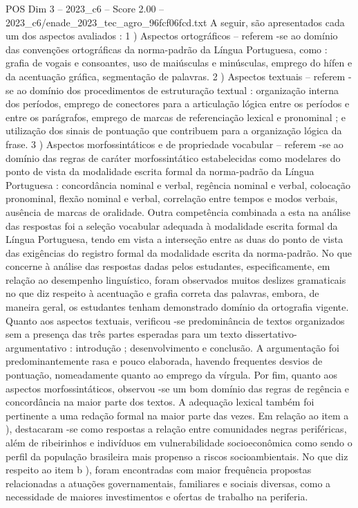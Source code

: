 \begin{textsample}{POS Dim 3 – 2023\_c6 – Score 2.00 – 2023\_c6/enade\_2023\_tec\_agro\_96fcf06fcd.txt}
A seguir, são apresentados cada um dos aspectos avaliados : 1 ) Aspectos ortográficos – referem -se ao domínio das convenções ortográficas da norma-padrão da Língua Portuguesa, como : grafia de vogais e consoantes, uso de maiúsculas e minúsculas, emprego do hífen e da acentuação gráfica, segmentação de palavras. 2 ) Aspectos textuais – referem -se ao domínio dos procedimentos de estruturação textual : organização interna dos períodos, emprego de conectores para a articulação lógica entre os períodos e entre os parágrafos, emprego de marcas de referenciação lexical e pronominal ; e utilização dos sinais de pontuação que contribuem para a organização lógica da frase. 3 ) Aspectos morfossintáticos e de propriedade vocabular – referem -se ao domínio das regras de caráter morfossintático estabelecidas como modelares do ponto de vista da modalidade escrita formal da norma-padrão da Língua Portuguesa : concordância nominal e verbal, regência nominal e verbal, colocação pronominal, flexão nominal e verbal, correlação entre tempos e modos verbais, ausência de marcas de oralidade.
Outra competência combinada a esta na análise das respostas foi a seleção vocabular adequada à modalidade escrita formal da Língua Portuguesa, tendo em vista a interseção entre as duas do ponto de vista das exigências do registro formal da modalidade escrita da norma-padrão.
No que concerne à análise das respostas dadas pelos estudantes, especificamente, em relação ao desempenho linguístico, foram observados muitos deslizes gramaticais no que diz respeito à acentuação e grafia correta das palavras, embora, de maneira geral, os estudantes tenham demonstrado domínio da ortografia vigente.
Quanto aos aspectos textuais, verificou -se predominância de textos organizados sem a presença das três partes esperadas para um texto dissertativo-argumentativo : introdução ; desenvolvimento e conclusão.
A argumentação foi predominantemente rasa e pouco elaborada, havendo frequentes desvios de pontuação, nomeadamente quanto ao emprego da vírgula.
Por fim, quanto aos aspectos morfossintáticos, observou -se um bom domínio das regras de regência e concordância na maior parte dos textos.
A adequação lexical também foi pertinente a uma redação formal na maior parte das vezes.
Em relação ao item a ), destacaram -se como respostas a relação entre comunidades negras periféricas, além de ribeirinhos e indivíduos em vulnerabilidade socioeconômica como sendo o perfil da população brasileira mais propenso a riscos socioambientais.
No que diz respeito ao item b ), foram encontradas com maior frequência propostas relacionadas a atuações governamentais, familiares e sociais diversas, como a necessidade de maiores investimentos e ofertas de trabalho na periferia.

\end{textsample}

